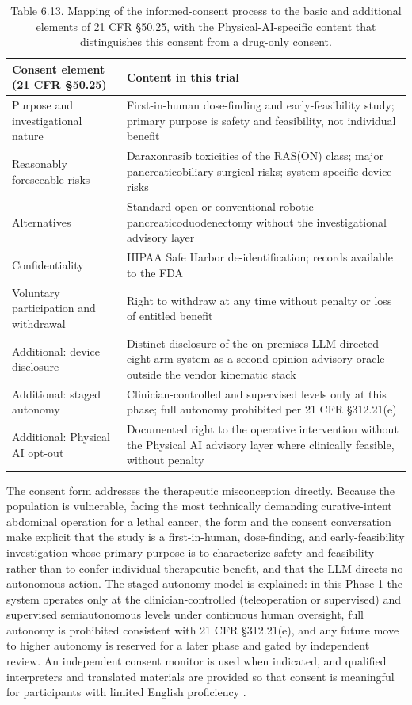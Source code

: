 \begin{table}[t]
\caption{Table 6.13. Mapping of the informed-consent process to the basic and
additional elements of 21 CFR \S 50.25, with the Physical-AI-specific content that
distinguishes this consent from a drug-only consent.}
\label{tab:sec06-consent}
\centering
\begin{tabularx}{\textwidth}{L{4.6cm} Y}
\toprule
\textbf{Consent element (21 CFR \S 50.25)} & \textbf{Content in this trial} \\
\midrule
Purpose and investigational nature & First-in-human dose-finding and early-feasibility study; primary purpose is safety and feasibility, not individual benefit \\
Reasonably foreseeable risks & Daraxonrasib toxicities of the RAS(ON) class; major pancreaticobiliary surgical risks; system-specific device risks \\
Alternatives & Standard open or conventional robotic pancreaticoduodenectomy without the investigational advisory layer \\
Confidentiality & HIPAA Safe Harbor de-identification; records available to the FDA \\
Voluntary participation and withdrawal & Right to withdraw at any time without penalty or loss of entitled benefit \\
Additional: device disclosure & Distinct disclosure of the on-premises LLM-directed eight-arm system as a second-opinion advisory oracle outside the vendor kinematic stack \\
Additional: staged autonomy & Clinician-controlled and supervised levels only at this phase; full autonomy prohibited per 21 CFR \S 312.21(e) \\
Additional: Physical AI opt-out & Documented right to the operative intervention without the Physical AI advisory layer where clinically feasible, without penalty \\
\bottomrule
\end{tabularx}
\end{table}

The consent form addresses the therapeutic misconception directly. Because the
population is vulnerable, facing the most technically demanding curative-intent
abdominal operation for a lethal cancer, the form and the consent conversation make
explicit that the study is a first-in-human, dose-finding, and early-feasibility
investigation whose primary purpose is to characterize safety and feasibility rather
than to confer individual therapeutic benefit, and that the LLM directs no autonomous
action. The staged-autonomy model is explained: in this Phase 1 the system operates
only at the clinician-controlled (teleoperation or supervised) and supervised
semiautonomous levels under continuous human oversight, full autonomy is prohibited
consistent with 21 CFR \S 312.21(e), and any future move to higher autonomy is
reserved for a later phase and gated by independent review. An independent consent
monitor is used when indicated, and qualified interpreters and translated materials
are provided so that consent is meaningful for participants with limited English
proficiency \cite{clintrustpai,oncotrialllm}.

